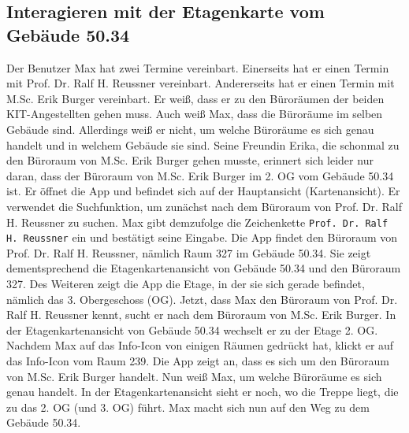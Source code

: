 \subsection{Interagieren mit der \Gls{Etagenkarte} vom Gebäude 50.34}

Der Benutzer Max hat zwei Termine vereinbart.
Einerseits hat er einen Termin mit Prof. Dr. Ralf H. Reussner vereinbart.
Andererseits hat er einen Termin mit M.Sc. Erik Burger vereinbart.
Er weiß, dass er zu den Büroräumen der beiden \Gls{KIT}-Angestellten gehen muss.
Auch weiß Max, dass die Büroräume im selben Gebäude sind.
Allerdings weiß er nicht, um welche Büroräume es sich genau handelt und in welchem Gebäude sie sind.
Seine Freundin Erika, die schonmal zu den Büroraum von M.Sc. Erik Burger gehen musste, erinnert sich leider nur daran, dass der Büroraum von M.Sc. Erik Burger im 2. OG vom Gebäude 50.34 ist.
Er öffnet die App und befindet sich auf der Hauptansicht (\Gls{Kartenansicht}).
Er verwendet die Suchfunktion, um zunächst nach dem Büroraum von Prof. Dr. Ralf H. Reussner zu suchen.
Max gibt demzufolge die \Gls{Zeichenkette} \texttt{Prof. Dr. Ralf H. Reussner} ein und bestätigt seine Eingabe.
Die App findet den Büroraum von Prof. Dr. Ralf H. Reussner, nämlich Raum 327 im Gebäude 50.34.
Sie zeigt dementsprechend die \Gls{Etagenkartenansicht} von Gebäude 50.34 und den Büroraum 327.
Des Weiteren zeigt die App die Etage, in der sie sich gerade befindet, nämlich das 3. Obergeschoss (OG).
Jetzt, dass Max den Büroraum von Prof. Dr. Ralf H. Reussner kennt, sucht er nach dem Büroraum von M.Sc. Erik Burger.
In der \Gls{Etagenkartenansicht} von Gebäude 50.34 wechselt er zu der Etage 2. OG.
Nachdem Max auf das Info-\Gls{Icon} von einigen Räumen gedrückt hat, klickt er auf das Info-\Gls{Icon} vom Raum 239.
Die App zeigt an, dass es sich um den Büroraum von M.Sc. Erik Burger handelt.
Nun weiß Max, um welche Büroräume es sich genau handelt.
In der \Gls{Etagenkartenansicht} sieht er noch, wo die Treppe liegt, die zu das 2. OG (und 3. OG) führt.
Max macht sich nun auf den Weg zu dem Gebäude 50.34.
